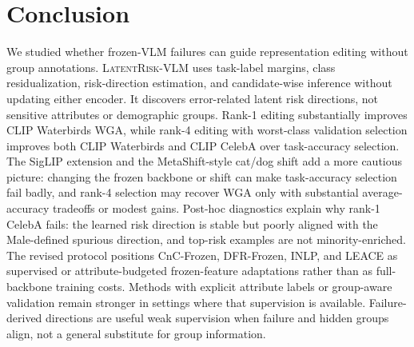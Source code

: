 \section{Conclusion}
We studied whether frozen-VLM failures can guide representation editing without group annotations. \textsc{LatentRisk-VLM} uses task-label margins, class residualization, risk-direction estimation, and candidate-wise inference without updating either encoder. It discovers error-related latent risk directions, not sensitive attributes or demographic groups. Rank-1 editing substantially improves CLIP Waterbirds WGA, while rank-4 editing with worst-class validation selection improves both CLIP Waterbirds and CLIP CelebA over task-accuracy selection. The SigLIP extension and the MetaShift-style cat/dog shift add a more cautious picture: changing the frozen backbone or shift can make task-accuracy selection fail badly, and rank-4 selection may recover WGA only with substantial average-accuracy tradeoffs or modest gains. Post-hoc diagnostics explain why rank-1 CelebA fails: the learned risk direction is stable but poorly aligned with the Male-defined spurious direction, and top-risk examples are not minority-enriched. The revised protocol positions CnC-Frozen, DFR-Frozen, INLP, and LEACE as supervised or attribute-budgeted frozen-feature adaptations rather than as full-backbone training costs. Methods with explicit attribute labels or group-aware validation remain stronger in settings where that supervision is available. Failure-derived directions are useful weak supervision when failure and hidden groups align, not a general substitute for group information.
